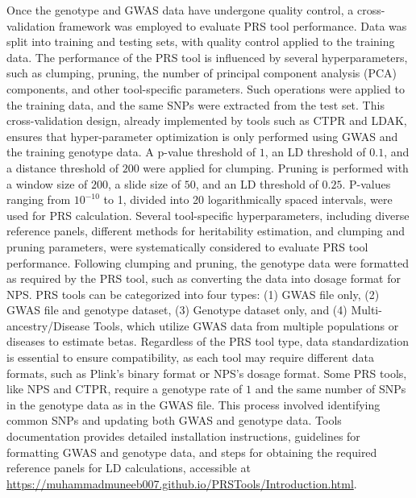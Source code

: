 \documentclass[pdflatex,sn-nature]{sn-jnl}%
\begin{document}
Once the genotype and GWAS data have undergone quality control, a cross-validation framework was employed to evaluate PRS tool performance. Data was split into training and testing sets, with quality control applied to the training data. The performance of the PRS tool is influenced by several hyperparameters, such as clumping, pruning, the number of principal component analysis (PCA) components, and other tool-specific parameters. Such operations were applied to the training data, and the same SNPs were extracted from the test set. This cross-validation design, already implemented by tools such as CTPR and LDAK, ensures that hyper-parameter optimization is only performed using GWAS and the training genotype data. A p-value threshold of $1$, an LD threshold of $0.1$, and a distance threshold of $200$ were applied for clumping. Pruning is performed with a window size of $200$, a slide size of $50$, and an LD threshold of $0.25$. P-values ranging from $10^{-10}$ to 1, divided into 20 logarithmically spaced intervals, were used for PRS calculation. Several tool-specific hyperparameters, including diverse reference panels, different methods for heritability estimation, and clumping and pruning parameters, were systematically considered to evaluate PRS tool performance. Following clumping and pruning, the genotype data were formatted as required by the PRS tool, such as converting the data into dosage format for NPS. PRS tools can be categorized into four types: (1) GWAS file only, (2) GWAS file and genotype dataset, (3) Genotype dataset only, and (4) Multi-ancestry/Disease Tools, which utilize GWAS data from multiple populations or diseases to estimate betas. Regardless of the PRS tool type, data standardization is essential to ensure compatibility, as each tool may require different data formats, such as Plink’s binary format or NPS’s dosage format. Some PRS tools, like NPS and CTPR, require a genotype rate of $1$ and the same number of SNPs in the genotype data as in the GWAS file. This process involved identifying common SNPs and updating both GWAS and genotype data. Tools documentation provides detailed installation instructions, guidelines for formatting GWAS and genotype data, and steps for obtaining the required reference panels for LD calculations, accessible at \url{https://muhammadmuneeb007.github.io/PRSTools/Introduction.html}.
\end{document}
